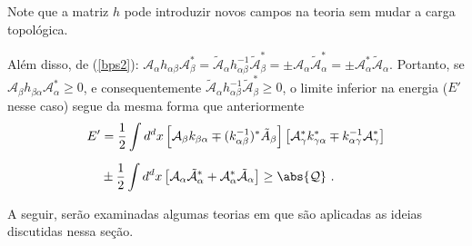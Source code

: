 Note que a matriz $h$ pode introduzir novos campos na teoria sem mudar a carga topológica.

Além disso, de (\ref{bps2}): $\mathcal{A}_\alpha h_{\alpha\beta} \mathcal{A}^*_\beta = \tilde{\mathcal{A}}_\alpha h^{-1}_{\alpha\beta}\tilde{\mathcal{A}}^*_\beta = \pm \mathcal{A}_\alpha\tilde{\mathcal{A}}^*_\alpha = \pm \mathcal{A}^*_\alpha\tilde{\mathcal{A}}_\alpha$. Portanto, se $\mathcal{A}_\beta h_{\beta\alpha}\mathcal{A}^*_\alpha \geq 0$, e consequentemente $\tilde{\mathcal{A}}_\alpha h^{-1}_{\alpha\beta}\tilde{\mathcal{A}}_\beta^* \geq 0$, o limite inferior na energia ($E'$ nesse caso) segue da mesma forma que anteriormente
\begin{equation}
\begin{split}
    E' &= \dfrac{1}{2} \int d^dx \left[\mathcal{A}_\beta k_{\beta\alpha} \mp (k^{-1}_{\alpha\beta})^*\tilde{A}_\beta \right] \left[\mathcal{A}_\gamma^*k^*_{\gamma\alpha} \mp k^{-1}_{\alpha\gamma}\mathcal{A}^*_\gamma \right] \\[0.2cm]
    &\pm \dfrac{1}{2} \int d^dx \left[\mathcal{A}_\alpha\tilde{\mathcal{A}}^*_\alpha + \mathcal{A}^*_\alpha \tilde{\mathcal{A}}_\alpha \right] \geq \abs{\mathcal{Q}} \ .
\end{split}
\end{equation}

A seguir, serão examinadas algumas teorias em que são aplicadas as ideias discutidas nessa seção.